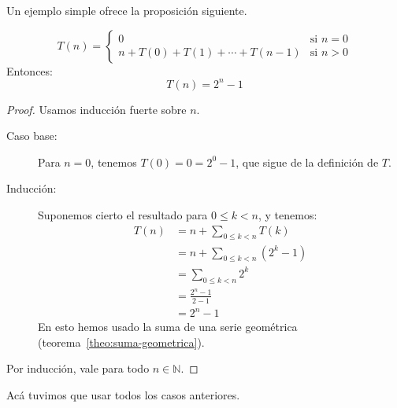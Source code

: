   Un ejemplo simple ofrece la proposición siguiente.
  \begin{proposition}
    \begin{equation*}
      T(n)
	=
	\begin{cases}
	  0				      & \text{si\ } n = 0 \\
	  n + T(0) + T(1) + \dotsb + T(n - 1) & \text{si\ } n > 0
	\end{cases}
    \end{equation*}
    Entonces:
    \begin{equation*}
      T(n)
	= 2^n - 1
    \end{equation*}
  \end{proposition}
  \begin{proof}
    Usamos inducción fuerte sobre \(n\).
    \begin{description}
    \item[Caso base:]
      Para \(n = 0\),
      tenemos \(T(0) = 0 = 2^0 - 1\),
      que sigue de la definición de \(T\).
    \item[Inducción:]
      Suponemos cierto el resultado para \(0 \le k < n\),
      y tenemos:
      \begin{align*}
	T(n)
	  &= n + \sum_{0 \le k < n} T(k) \\
	  &= n + \sum_{0 \le k < n} (2^k - 1) \\
	  &= \sum_{0 \le k < n} 2^k \\
	  &= \frac{2^n - 1}{2 - 1} \\
	  &= 2^n - 1
      \end{align*}
      En esto hemos usado la suma de una serie geométrica
      (teorema~\ref{theo:suma-geometrica}).
    \end{description}
    Por inducción,
    vale para todo \(n \in \mathbb{N}\).
  \end{proof}
  Acá tuvimos que usar todos los casos anteriores.

